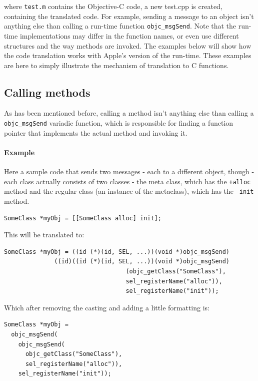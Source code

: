 where \verb=test.m= contains the Objective-C code, a new test.cpp is created, containing the translated code. For example, sending a message to an object isn't anything else than calling a run-time function \verb=objc_msgSend=. Note that the run-time implementations may differ in the function names, or even use different structures and the way methods are invoked. The examples below will show how the code translation works with Apple's version of the run-time. These examples are here to simply illustrate the mechanism of translation to C functions.

\subsection{Calling methods}

As has been mentioned before, calling a method isn't anything else than calling a \verb=objc_msgSend= variadic function, which is responsible for finding a function pointer that implements the actual method and invoking it.

\paragraph{Example}
Here a sample code that sends two messages - each to a different object, though - each class actually consists of two classes - the meta class, which has the \verb=+alloc= method and the regular class (an instance of the metaclass), which has the \verb=-init= method.

\begin{verbatim}SomeClass *myObj = [[SomeClass alloc] init];\end{verbatim}

This will be translated to:
\begin{verbatim}SomeClass *myObj = ((id (*)(id, SEL, ...))(void *)objc_msgSend)
              ((id)((id (*)(id, SEL, ...))(void *)objc_msgSend)
                                  (objc_getClass("SomeClass"),
                                  sel_registerName("alloc")), 
                                  sel_registerName("init"));
\end{verbatim}

Which after removing the casting and adding a little formatting is:

\label{Code example}
\begin{verbatim}SomeClass *myObj = 
  objc_msgSend(
    objc_msgSend(
      objc_getClass("SomeClass"),  
      sel_registerName("alloc")), 
    sel_registerName("init"));
\end{verbatim}

